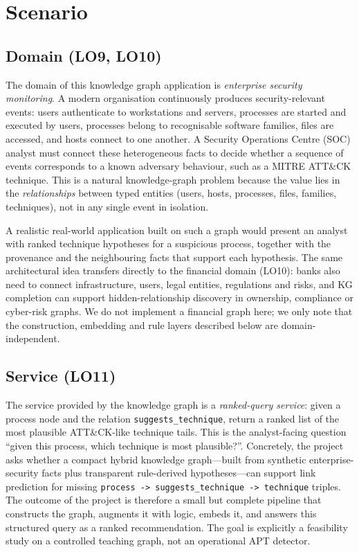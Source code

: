 \documentclass{article}
\begin{document}
\clearpage

\section{Scenario}
\subsection{Domain (LO9, LO10)}
The domain of this knowledge graph application is \emph{enterprise security
monitoring}. A modern organisation continuously produces security-relevant
events: users authenticate to workstations and servers, processes are started
and executed by users, processes belong to recognisable software families,
files are accessed, and hosts connect to one another. A Security Operations
Centre (SOC) analyst must connect these heterogeneous facts to decide whether a
sequence of events corresponds to a known adversary behaviour, such as a MITRE
ATT\&CK technique. This is a natural knowledge-graph problem because the value
lies in the \emph{relationships} between typed entities (users, hosts,
processes, files, families, techniques), not in any single event in isolation.

A realistic real-world application built on such a graph would present an
analyst with ranked technique hypotheses for a suspicious process, together
with the provenance and the neighbouring facts that support each hypothesis.
The same architectural idea transfers directly to the financial domain (LO10):
banks also need to connect infrastructure, users, legal entities, regulations
and risks, and KG completion can support hidden-relationship discovery in
ownership, compliance or cyber-risk graphs. We do not implement a financial
graph here; we only note that the construction, embedding and rule layers
described below are domain-independent.

\subsection{Service (LO11)}
The service provided by the knowledge graph is a \emph{ranked-query service}:
given a process node and the relation \texttt{suggests\_technique}, return a
ranked list of the most plausible ATT\&CK-like technique tails. This is the
analyst-facing question ``given this process, which technique is most
plausible?''. Concretely, the project asks whether a compact hybrid knowledge
graph---built from synthetic enterprise-security facts plus transparent
rule-derived hypotheses---can support link prediction for missing
\texttt{process -> suggests\_technique -> technique} triples. The outcome of the
project is therefore a small but complete pipeline that constructs the graph,
augments it with logic, embeds it, and answers this structured query as a
ranked recommendation. The goal is explicitly a feasibility study on a
controlled teaching graph, not an operational APT detector.
\end{document}
